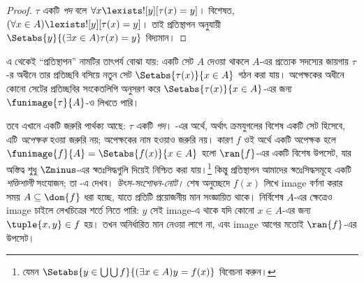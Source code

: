 \documentclass[../../../include/open-logic-section]{subfiles}
\begin{document}
\begin{proof}
$\tau$ একটি \emph{পদ} বলে $\forall x \lexists![y][\tau(x) = y]$।
বিশেষত, $(\forall x \in A)\lexists![y][\tau(x) = y]$। তাই
প্রতিস্থাপন অনুযায়ী $\Setabs{y}{(\exists x \in A)\tau(x) = y}$
বিদ্যমান।
\end{proof}
\noindent
এ থেকেই ``প্রতিস্থাপন'' নামটির তাৎপর্য বোঝা যায়: একটি
সেট $A$ দেওয়া থাকলে $A$-এর প্রত্যেক সদস্যের জায়গায় $\tau$-র অধীনে তার
প্রতিচ্ছবি বসিয়ে নতুন সেট $\Setabs{\tau(x)}{x \in A}$
গঠন করা যায়। অপেক্ষকের অধীনে কোনো সেটের প্রতিচ্ছবির
সংকেতলিপি অনুসরণ করে $\Setabs{\tau(x)}{x \in A}$-এর
জন্য $\funimage{\tau}{A}$-ও লিখতে পারি।

তবে এখানে একটি জরুরি পার্থক্য আছে: $\tau$ একটি \emph{পদ}।
-এর অর্থে, অর্থাৎ ক্রমযুগলের
বিশেষ একটি সেট হিসেবে, এটি \emph{অপেক্ষক} হওয়া জরুরি নয়;
অপেক্ষকের নাম হওয়াও জরুরি নয়। কারণ $f$ ওই অর্থে একটি
অপেক্ষক হলে $\funimage{f}{A} = \Setabs{f(x)}{x \in
A}$ হলো $\ran{f}$-এর একটি বিশেষ উপসেট, যার অস্তিত্ব
শুধু $\Zminus$-এর স্বতঃসিদ্ধগুলি দিয়েই নিশ্চিত করা যায়।\footnote{যেমন
$\Setabs{y \in \bigcup \bigcup f}{(\exists x \in A)y =
f(x)}$ বিবেচনা করুন।} কিন্তু প্রতিস্থাপন আমাদের
স্বতঃসিদ্ধসমূহে একটি \emph{শক্তিশালী} সংযোজন; তা
-এ দেখব।
\emph{উৎস-সংশোধন-নোট।} শেষ অনুচ্ছেদে $f(x)$ লিখে image
বর্ণনা করার সময় $A\subseteq\dom{f}$ ধরা হচ্ছে, যাতে প্রতিটি
প্রয়োজনীয় মান সংজ্ঞায়িত থাকে। নির্বিশেষ $A$-এর ক্ষেত্রেও
image চাইলে লেখচিত্রের শর্তে নিতে পারি:
$y$ সেই image-এ থাকে যদি কোনো $x\in A$-এর জন্য
$\tuple{x,y}\in f$ হয়। তখন অনির্ধারিত মান নেওয়া লাগে না,
এবং image আগের মতোই $\ran{f}$-এর উপসেট।
\end{document}
